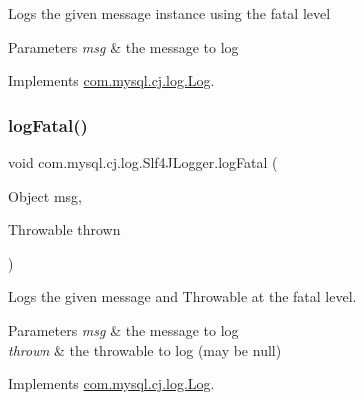 Logs the given message instance using the \textquotesingle{}fatal\textquotesingle{} level


\begin{DoxyParams}{Parameters}
{\em msg} & the message to log \\
\hline
\end{DoxyParams}


Implements \mbox{\hyperlink{interfacecom_1_1mysql_1_1cj_1_1log_1_1_log_a4f36fdcde6b1c88a4f1ba25a70555e3f}{com.\+mysql.\+cj.\+log.\+Log}}.

\mbox{\label{classcom_1_1mysql_1_1cj_1_1log_1_1_slf4_j_logger_ac61e11ed170d64dec00903990ac86778}} 
\subsubsection{\texorpdfstring{log\+Fatal()}{logFatal()}\hspace{0.1cm}{\footnotesize\ttfamily [2/2]}}
{\footnotesize\ttfamily void com.\+mysql.\+cj.\+log.\+Slf4\+J\+Logger.\+log\+Fatal (\begin{DoxyParamCaption}\item[{Object}]{msg,  }\item[{Throwable}]{thrown }\end{DoxyParamCaption})}

Logs the given message and Throwable at the \textquotesingle{}fatal\textquotesingle{} level.


\begin{DoxyParams}{Parameters}
{\em msg} & the message to log \\
\hline
{\em thrown} & the throwable to log (may be null) \\
\hline
\end{DoxyParams}


Implements \mbox{\hyperlink{interfacecom_1_1mysql_1_1cj_1_1log_1_1_log_a54cd5e19bf210ab86b373400e2213229}{com.\+mysql.\+cj.\+log.\+Log}}.

\mbox{\label{classcom_1_1mysql_1_1cj_1_1log_1_1_slf4_j_logger_a3444f6e7cb48a80d3cf82acf93a74c27}} 
